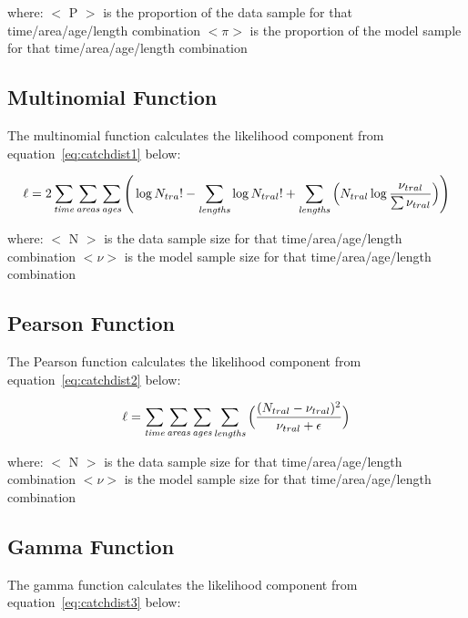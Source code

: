 \documentclass[10pt,twoside]{book}
\begin{document}
where:\newline
$<$ P $>$ is the proportion of the data sample for that time/area/age/length combination\newline
$<\pi>$ is the proportion of the model sample for that time/area/age/length combination

\subsection{Multinomial Function}
The multinomial function calculates the likelihood component from equation~\ref{eq:catchdist1} below:

\begin{equation}\label{eq:catchdist1}
\ell = 2 \sum_{\it time}\sum_{\it areas}\sum_{\it ages} \Bigg( \log N_{tra}! - \sum_{\it lengths} \log N_{tral}! + \sum_{\it lengths} \Big( N_{tral} \log {\frac{\nu_{tral}}{\sum \nu_{tral}}} \Big) \Bigg)
\end{equation}

where:\newline
$<$ N $>$ is the data sample size for that time/area/age/length combination\newline
$<\nu>$ is the model sample size for that time/area/age/length combination

\subsection{Pearson Function}
The Pearson function calculates the likelihood component from equation~\ref{eq:catchdist2} below:

\begin{equation}\label{eq:catchdist2}
\ell = \sum_{\it time}\sum_{\it areas}\sum_{\it ages}\sum_{\it lengths} \Big( {\frac{ ( N_{tral} - \nu_{tral} ) ^2} {\nu_{tral} + \epsilon}} \Big)
\end{equation}

where:\newline
$<$ N $>$ is the data sample size for that time/area/age/length combination\newline
$<\nu>$ is the model sample size for that time/area/age/length combination

\subsection{Gamma Function}
The gamma function calculates the likelihood component from equation~\ref{eq:catchdist3} below:
\end{document}
